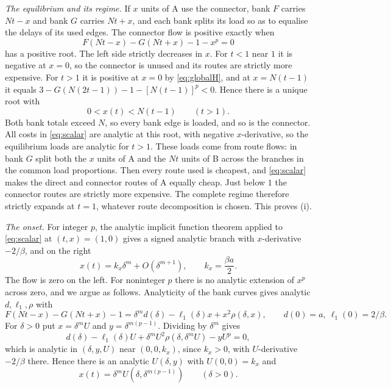 \emph{The equilibrium and its regime.} If $x$ units of A use the connector, bank $F$ carries $Nt-x$ and bank $G$ carries $Nt+x$, and each bank splits its load so as to equalise the delays of its used edges. The connector flow is positive exactly when
\begin{equation}\label{eq:scalar}
 F(Nt-x)-G(Nt+x)-1-x^p=0
\end{equation}
has a positive root. The left side strictly decreases in $x$. For $t<1$ near $1$ it is negative at $x=0$, so the connector is unused and its routes are strictly more expensive. For $t>1$ it is positive at $x=0$ by \eqref{eq:globalH}, and at $x=N(t-1)$ it equals $3-G(N(2t-1))-1-[N(t-1)]^p<0$. Hence there is a unique root with
\begin{equation}\label{eq:rootbound}
 0<x(t)<N(t-1)\qquad(t>1).
\end{equation}
Both bank totals exceed $N$, so every bank edge is loaded, and so is the connector. All costs in \eqref{eq:scalar} are analytic at this root, with negative $x$-derivative, so the equilibrium loads are analytic for $t>1$. These loads come from route flows: in bank $G$ split both the $x$ units of A and the $Nt$ units of B across the branches in the common load proportions. Then every route used is cheapest, and \eqref{eq:scalar} makes the direct and connector routes of A equally cheap. Just below $1$ the connector routes are strictly more expensive. The complete regime therefore strictly expands at $t=1$, whatever route decomposition is chosen. This proves (i).

\emph{The onset.} For integer $p$, the analytic implicit function theorem applied to \eqref{eq:scalar} at $(t,x)=(1,0)$ gives a signed analytic branch with $x$-derivative $-2/\beta$, and on the right
\begin{equation}\label{eq:xasymptotic}
 x(t)=k_x\delta^m+O(\delta^{m+1}),\qquad k_x=\frac{\beta a}2.
\end{equation}
The flow is zero on the left. For noninteger $p$ there is no analytic extension of $x^p$ across zero, and we argue as follows. Analyticity of the bank curves gives analytic $d,\ell_1,\rho$ with
\begin{equation}\label{eq:implicitgeneral}
 F(Nt-x)-G(Nt+x)-1=\delta^md(\delta)-\ell_1(\delta)x+x^2\rho(\delta,x),\qquad d(0)=a,\ \ell_1(0)=2/\beta.
\end{equation}
For $\delta>0$ put $x=\delta^mU$ and $y=\delta^{m(p-1)}$. Dividing by $\delta^m$ gives
\begin{equation}\label{eq:Uequation}
 d(\delta)-\ell_1(\delta)U+\delta^mU^2\rho(\delta,\delta^mU)-yU^p=0,
\end{equation}
which is analytic in $(\delta,y,U)$ near $(0,0,k_x)$, since $k_x>0$, with $U$-derivative $-2/\beta$ there. Hence there is an analytic $U(\delta,y)$ with $U(0,0)=k_x$ and
\begin{equation}\label{eq:twovar}
 x(t)=\delta^mU(\delta,\delta^{m(p-1)})\qquad(\delta>0).
\end{equation}

